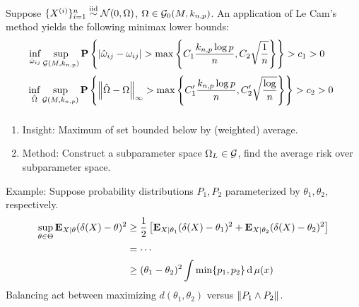 \begin{frame}[fragile] \frametitle{}

    \vspace{0.5cm}
    Suppose $\{X^{(i)}\}_{i=1}^n \stackrel{\mathrm{iid}}{\sim} \mathcal{N}(0, \Omega)$, $\Omega \in \mathcal{G}_0(M,
    k_{n, p})$.  An application of Le Cam's method yields the following minimax
    lower bounds:
    \vspace{0.2cm}
    $$
    \hspace{-0.5cm}
    \inf_{\hat\omega_{ij}} \sup_{\Gg(M, k_{n, p})}
    \PP\left\{
    |\hat\omega_{ij} - \omega_{ij}| > \max\left\{
    C_1\frac{k_{n, p}\log p}{n}, C_2 \sqrt\frac{1}{n}
    \right\}
    \right\} > c_1 > 0
    $$
    $$
    \hspace{-0.2cm}
    \inf_{\hat\Omega} \sup_{\Gg(M, k_{n, p})}
    \PP\left\{
        \norm{\hat\Omega - \Omega}_\infty > \max\left\{
    C_1'\frac{k_{n, p}\log p}{n}, C_2' \sqrt\frac{\log}{n}
    \right\}
    \right\} > c_2 > 0
    $$
    
\end{frame}
\begin{frame}[fragile] \frametitle{}
    \begin{enumerate}
        \item Insight: Maximum of set bounded below by (weighted) average.
        \item Method: Construct a subparameter space $\Omega_L \in \mathcal{G}$, find
            the average risk over subparameter space.
    \end{enumerate}
    \vspace{-0.3cm}
    Example: Suppose probability distributions $P_1, P_2$ parameterized by
    $\theta_1, \theta_2$, respectively.
    \vspace{-0.2cm}
    \begin{align*}
        \sup_{\theta \in \Theta} \mathbf{E}_{X|\theta} (\delta(X) - \theta)^2
        &\geq \frac{1}{2}\left[
        \mathbf{E}_{X|\theta_1} (\delta(X) - \theta_1)^2
        +
        \mathbf{E}_{X|\theta_2} (\delta(X) - \theta_2)^2
        \right] \\
        &=      \cdots  \\
        &\geq (\theta_1 - \theta_2)^2 \int \min\{p_1, p_2\} \operatorname{\mathrm{d}} \mu(x)
    \end{align*}
    Balancing act between maximizing $d(\theta_1, \theta_2)$ versus
    $\left\lVert P_1 \wedge P_2\right\rVert$.
\end{frame}
